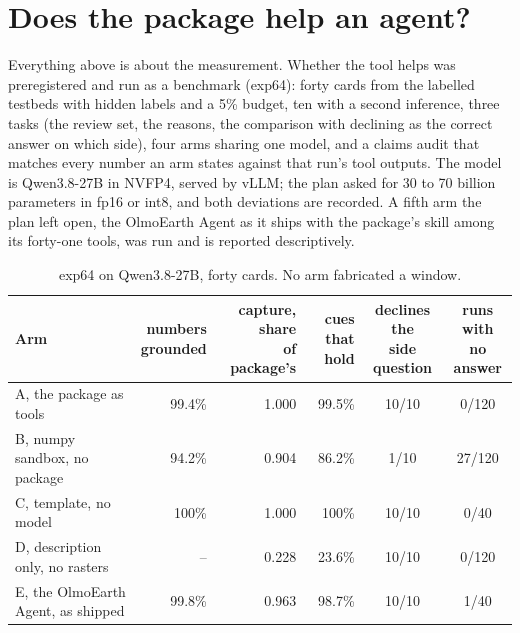 \documentclass[11pt,a4paper]{article}
\begin{document}
\section{Does the package help an agent?}
\label{sec:agent}

Everything above is about the measurement. Whether the tool helps was
preregistered and run as a benchmark (exp64): forty cards from the labelled
testbeds with hidden labels and a 5\% budget, ten with a second inference, three
tasks (the review set, the reasons, the comparison with declining as the correct
answer on which side), four arms sharing one model, and a claims audit that
matches every number an arm states against that run's tool outputs. The model is
Qwen3.8-27B in NVFP4, served by vLLM; the plan asked for 30 to 70 billion
parameters in fp16 or int8, and both deviations are recorded. A fifth arm the
plan left open, the OlmoEarth Agent as it ships with the package's skill among
its forty-one tools, was run and is reported descriptively.

\begin{table}[h]
\centering\footnotesize
\setlength{\tabcolsep}{5pt}
\begin{tabular}{@{}l r r r c c@{}}
\toprule
Arm & \shortstack[r]{numbers\\grounded} & \shortstack[r]{capture, share\\of package's} & \shortstack[r]{cues\\that hold} & \shortstack{declines the\\side question} & \shortstack{runs with\\no answer} \\
\midrule
A, the package as tools & 99.4\% & 1.000 & 99.5\% & 10/10 & 0/120 \\
B, numpy sandbox, no package & 94.2\% & 0.904 & 86.2\% & 1/10 & 27/120 \\
C, template, no model & 100\% & 1.000 & 100\% & 10/10 & 0/40 \\
D, description only, no rasters & -- & 0.228 & 23.6\% & 10/10 & 0/120 \\
E, the OlmoEarth Agent, as shipped & 99.8\% & 0.963 & 98.7\% & 10/10 & 1/40 \\
\bottomrule
\end{tabular}
\caption{exp64 on Qwen3.8-27B, forty cards. No arm fabricated a window.}
\end{table}
\end{document}
